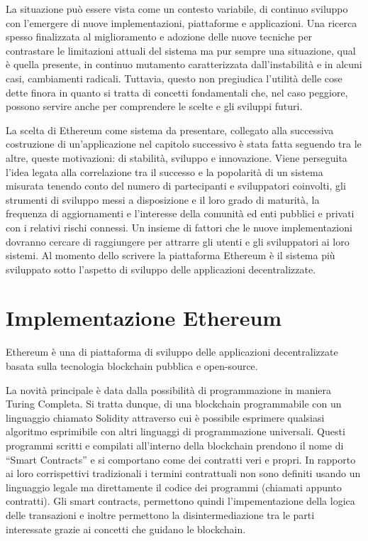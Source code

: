 La situazione può essere vista come un contesto variabile, di continuo sviluppo con l’emergere di nuove implementazioni, piattaforme e applicazioni. Una ricerca spesso finalizzata al miglioramento e adozione delle nuove tecniche per contrastare le limitazioni attuali del sistema ma pur sempre una situazione, qual è quella presente, in continuo mutamento caratterizzata dall'instabilità e in alcuni casi, cambiamenti radicali. Tuttavia, questo non pregiudica l’utilità delle cose dette finora in quanto si tratta di concetti fondamentali che, nel caso peggiore, possono servire anche per comprendere le scelte e gli sviluppi futuri. 

La scelta di Ethereum come sistema da presentare, collegato alla successiva costruzione di un’applicazione nel capitolo successivo è stata fatta seguendo tra le altre, queste motivazioni: di stabilità, sviluppo e innovazione. Viene perseguita l'idea legata alla correlazione tra il successo e la popolarità di un sistema misurata tenendo conto del numero di partecipanti e sviluppatori coinvolti, gli strumenti di sviluppo messi a disposizione e il loro grado di maturità, la frequenza di aggiornamenti e l’interesse della comunità ed enti pubblici e privati con i relativi rischi connessi. Un insieme di fattori che le nuove implementazioni dovranno cercare di raggiungere per attrarre gli utenti e gli sviluppatori ai loro sistemi. Al momento dello scrivere la piattaforma Ethereum è il sistema più sviluppato sotto l’aspetto di sviluppo delle applicazioni decentralizzate.

\section{Implementazione Ethereum}

Ethereum è una di piattaforma di sviluppo delle applicazioni decentralizzate basata sulla tecnologia blockchain pubblica e open-source.

La novità principale è data dalla possibilità di programmazione in maniera Turing Completa. Si tratta dunque, di una blockchain programmabile con un linguaggio chiamato Solidity attraverso cui è possibile esprimere qualsiasi algoritmo esprimibile con altri linguaggi di programmazione universali. Questi programmi scritti e compilati all’interno della blockchain prendono il nome di “Smart Contracts” e si comportano come dei contratti veri e propri. In rapporto ai loro corrispettivi tradizionali i termini contrattuali non sono definiti usando un linguaggio legale ma direttamente il codice dei programmi (chiamati appunto contratti). Gli smart contracts, permettono quindi l’impementazione della logica delle transazioni e inoltre permettono la disintermediazione tra le parti interessate grazie ai concetti che guidano le blockchain. 

